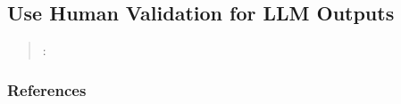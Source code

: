 



\subsection{Use Human Validation for LLM Outputs}
\label{sec:use-human-validation-for-llm-outputs}

\begin{quote}
\summary: 
\end{quote}



\subsubsection{References}





